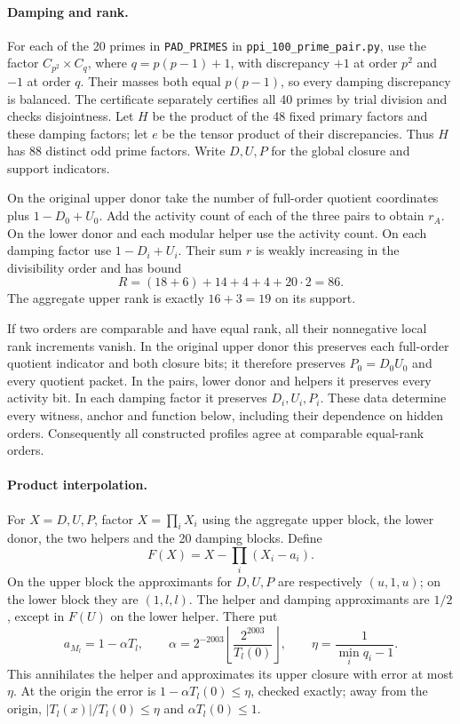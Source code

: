 \paragraph{Damping and rank.}
For each of the 20 primes in \texttt{PAD\_PRIMES} in \texttt{ppi\_100\_prime\_pair.py}, use the factor
$C_{p^2}\times C_q$, where $q=p(p-1)+1$, with discrepancy $+1$ at
order $p^2$ and $-1$ at order $q$.  Their masses both equal $p(p-1)$,
so every damping discrepancy is balanced.  The certificate separately
certifies all 40 primes by trial division and checks disjointness.
Let $H$ be the product of the 48 fixed primary factors and these damping
factors; let $e$ be the tensor product of their discrepancies.  Thus
$H$ has 88 distinct odd prime factors.  Write $D,U,P$ for the global
closure and support indicators.

On the original upper donor take the number of full-order quotient
coordinates plus $1-D_0+U_0$.  Add the activity count of each of the
three pairs to obtain $r_A$.  On the lower donor and each modular helper
use the activity count.  On each damping factor use $1-D_i+U_i$.
Their sum $r$ is weakly increasing in the divisibility order and has
bound
\begin{equation}\label{h100:rank-bound}
 R=(18+6)+14+4+4+20\cdot2=86.
\end{equation}
The aggregate upper rank is exactly $16+3=19$ on its support.

If two orders are comparable and have equal rank, all their nonnegative
local rank increments vanish.  In the original upper donor this preserves
each full-order quotient indicator and both closure bits; it therefore
preserves $P_0=D_0U_0$ and every quotient packet.  In the pairs, lower
donor and helpers it preserves every activity bit.  In each damping
factor it preserves $D_i,U_i,P_i$.  These data determine every witness,
anchor and function below, including their dependence on hidden orders.
Consequently all constructed profiles agree at comparable equal-rank
orders.

\paragraph{Product interpolation.}
For $X=D,U,P$, factor $X=\prod_i X_i$ using the aggregate upper block,
the lower donor, the two helpers and the 20 damping blocks.  Define
\begin{equation}\label{h100:product-interpolation}
 F(X)=X-\prod_i(X_i-a_i).
\end{equation}
On the upper block the approximants for $D,U,P$ are respectively
$(u,1,u)$; on the lower block they are $(1,l,l)$.  The helper and damping
approximants are $1/2$, except in $F(U)$ on the lower helper.  There put
\[
 a_{M_l}=1-\alpha T_l,\qquad
 \alpha=2^{-2003}\left\lfloor\frac{2^{2003}}{T_l(0)}\right\rfloor,
 \qquad \eta=\frac1{\min_i q_i-1}.
\]
This annihilates the helper and approximates its upper closure with
error at most $\eta$.  At the origin the error is
$1-\alpha T_l(0)\le\eta$, checked exactly; away from the origin,
$|T_l(x)|/T_l(0)\le\eta$ and $\alpha T_l(0)\le1$.

